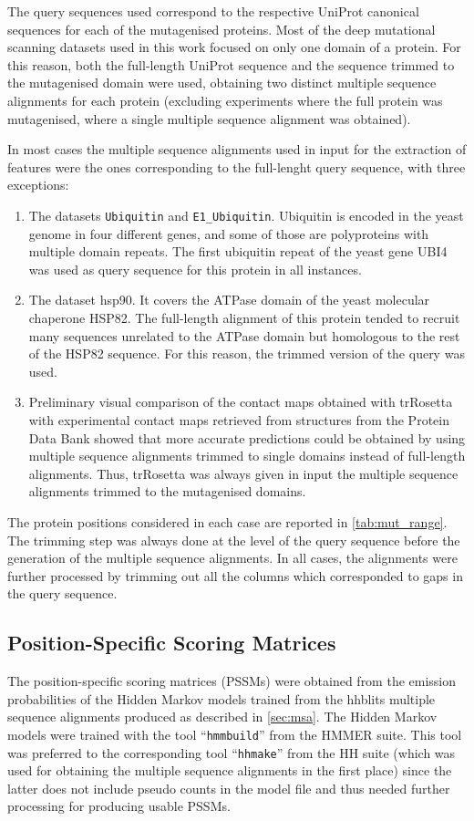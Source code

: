 The query sequences used correspond to the respective UniProt canonical sequences for each of the mutagenised proteins.
Most of the deep mutational scanning datasets used in this work focused on only one domain of a protein.
For this reason, both the full-length UniProt sequence and the sequence trimmed to the mutagenised domain were used, obtaining two distinct multiple sequence alignments for each protein (excluding experiments where the full protein was mutagenised, where a single multiple sequence alignment was obtained).

In most cases the multiple sequence alignments used in input for the extraction of features were the ones corresponding to the full-lenght query sequence, with three exceptions:
\begin{enumerate}[label= (\roman*)]
	\item The datasets \texttt{Ubiquitin} and \texttt{E1\_Ubiquitin}.
	      Ubiquitin is encoded in the yeast genome in four different genes, and some of those are polyproteins with multiple domain repeats.
	      The first ubiquitin repeat of the yeast gene UBI4 was used as query sequence for this protein in all instances.\
	\item The dataset hsp90. It covers the ATPase domain of the yeast molecular chaperone HSP82.
	      The full-length alignment of this protein tended to recruit many sequences unrelated to the ATPase domain but homologous to the rest of the HSP82 sequence.
	      For this reason, the trimmed version of the query was used.\
	\item Preliminary visual comparison of the contact maps obtained with trRosetta with experimental contact maps retrieved from structures from the Protein Data Bank showed that more accurate predictions could be obtained by using multiple sequence alignments trimmed to single domains instead of full-length alignments.
	      Thus, trRosetta was always given in input the multiple sequence alignments trimmed to the mutagenised domains.
\end{enumerate}

The protein positions considered in each case are reported in \cref{tab:mut_range}.
The trimming step was always done at the level of the query sequence before the generation of the multiple sequence alignments.
In all cases, the alignments were further processed by trimming out all the columns which corresponded to gaps in the query sequence.

\subsection{Position-Specific Scoring Matrices}
The position-specific scoring matrices (PSSMs) were obtained from the emission probabilities of the Hidden Markov models trained from the hhblits multiple sequence alignments produced as described in \cref{sec:msa}.
The Hidden Markov models were trained with the tool ``\texttt{hmmbuild}'' from the HMMER suite.
This tool was preferred to the corresponding tool ``\texttt{hhmake}'' from the HH suite (which was used for obtaining the multiple sequence alignments in the first place) since the latter does not include pseudo counts in the model file and thus needed further processing for producing usable PSSMs.

